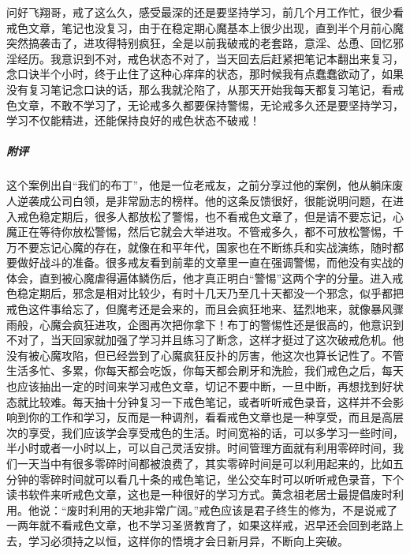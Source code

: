 \begin{case}
    问好飞翔哥，戒了这么久，感受最深的还是要坚持学习，前几个月工作忙，很少看戒色文章，笔记也没复习，由于在稳定期心魔基本上很少出现，直到半个月前心魔突然搞袭击了，进攻得特别疯狂，全是以前我破戒的老套路，意淫、怂恿、回忆邪淫经历。我意识到不对，戒色状态不对了，当天回去后赶紧把笔记本翻出来复习，念口诀半个小时，终于止住了这种心痒痒的状态，那时候我有点蠢蠢欲动了，如果没有复习笔记念口诀的话，那么我就沦陷了，从那天开始我每天都复习笔记，看戒色文章，不敢不学习了，无论戒多久都要保持警惕，无论戒多久还是要坚持学习，学习不仅能精进，还能保持良好的戒色状态不破戒！
    \subparagraph{附评} 这个案例出自“我们的布丁”，他是一位老戒友，之前分享过他的案例，他从躺床废人逆袭成公司白领，是非常励志的榜样。他的这条反馈很好，很能说明问题，在进入戒色稳定期后，很多人都放松了警惕，也不看戒色文章了，但是请不要忘记，心魔正在等待你放松警惕，然后它就会大举进攻。不管戒多久，都不可放松警惕，千万不要忘记心魔的存在，就像在和平年代，国家也在不断练兵和实战演练，随时都要做好战斗的准备。很多戒友看到前辈的文章里一直在强调警惕，而他没有实战的体会，直到被心魔虐得遍体鳞伤后，他才真正明白“警惕”这两个字的分量。进入戒色稳定期后，邪念是相对比较少，有时十几天乃至几十天都没一个邪念，似乎都把戒色这件事给忘了，但魔考还是会来的，而且会疯狂地来、猛烈地来，就像暴风骤雨般，心魔会疯狂进攻，企图再次把你拿下！布丁的警惕性还是很高的，他意识到不对了，当天回家就加强了学习并且练习了断念，这样才挺过了这次破戒危机。他没有被心魔攻陷，但已经尝到了心魔疯狂反扑的厉害，他这次也算长记性了。不管生活多忙、多累，你每天都会吃饭，你每天都会刷牙和洗脸，我们戒色之后，每天也应该抽出一定的时间来学习戒色文章，切记不要中断，一旦中断，再想找到好状态就比较难。每天抽十分钟复习一下戒色笔记，或者听听戒色录音，这样并不会影响到你的工作和学习，反而是一种调剂，看看戒色文章也是一种享受，而且是高层次的享受，我们应该学会享受戒色的生活。时间宽裕的话，可以多学习一些时间，半小时或者一小时以上，可以自己灵活安排。时间管理方面就有利用零碎时间，我们一天当中有很多零碎时间都被浪费了，其实零碎时间是可以利用起来的，比如五分钟的零碎时间就可以看几十条的戒色笔记，坐公交车时可以听听戒色录音，下个读书软件来听戒色文章，这也是一种很好的学习方式。黄念祖老居士最提倡废时利用。他说：“废时利用的天地非常广阔。”戒色应该是君子终生的修为，不是说戒了一两年就不看戒色文章，也不学习圣贤教育了，如果这样戒，迟早还会回到老路上去，学习必须持之以恒，这样你的悟境才会日新月异，不断向上突破。
\end{case}

